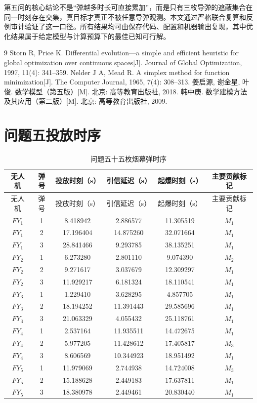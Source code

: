 \documentclass[12pt,a4paper]{article}
\begin{document}
第五问的核心结论不是“弹越多时长可直接累加”，而是只有三枚导弹的遮蔽集合在同一时刻存在交集，真目标才真正不被任意导弹观测。本文通过严格联合复算和反例审计验证了这一口径。所有结果均可由保存代码、配置和机器输出复现，其中优化结果属于给定模型与计算预算下的最佳已知可行解。

\begin{thebibliography}{9}
 Storn R, Price K. Differential evolution---a simple and efficient heuristic for global optimization over continuous spaces[J]. Journal of Global Optimization, 1997, 11(4): 341--359.
 Nelder J A, Mead R. A simplex method for function minimization[J]. The Computer Journal, 1965, 7(4): 308--313.
 姜启源, 谢金星, 叶俊. 数学模型（第五版）[M]. 北京: 高等教育出版社, 2018.
 韩中庚. 数学建模方法及其应用（第二版）[M]. 北京: 高等教育出版社, 2009.
\end{thebibliography}

\newpage
\appendix
\section{问题五投放时序}

\begin{longtable}{cccccc}
\caption{问题五十五枚烟幕弹时序}\label{tab:q5-timing}\\
\toprule
无人机 & 弹号 & 投放时刻（s） & 引信延迟（s） & 起爆时刻（s） & 主要贡献标记 \\
\midrule
\endfirsthead
\toprule
无人机 & 弹号 & 投放时刻（s） & 引信延迟（s） & 起爆时刻（s） & 主要贡献标记 \\
\midrule
\endhead
$FY_1$ & 1 & 8.418942 & 2.886577 & 11.305519 & $M_1$ \\
$FY_1$ & 2 & 17.196404 & 14.875260 & 32.071664 & $M_1$ \\
$FY_1$ & 3 & 28.841466 & 9.293785 & 38.135251 & $M_1$ \\
$FY_2$ & 1 & 6.273280 & 2.801110 & 9.074390 & $M_2$ \\
$FY_2$ & 2 & 9.271617 & 3.037679 & 12.309297 & $M_1$ \\
$FY_2$ & 3 & 11.929217 & 6.181324 & 18.110541 & $M_1$ \\
$FY_3$ & 1 & 1.229410 & 3.628295 & 4.857705 & $M_1$ \\
$FY_3$ & 2 & 18.194252 & 11.391443 & 29.585696 & $M_1$ \\
$FY_3$ & 3 & 21.063329 & 4.055432 & 25.118761 & $M_1$ \\
$FY_4$ & 1 & 2.537164 & 11.935511 & 14.472675 & $M_1$ \\
$FY_4$ & 2 & 5.977205 & 11.428612 & 17.405817 & $M_3$ \\
$FY_4$ & 3 & 8.606569 & 10.344923 & 18.951492 & $M_1$ \\
$FY_5$ & 1 & 11.979069 & 2.744938 & 14.724008 & $M_3$ \\
$FY_5$ & 2 & 15.188628 & 2.449183 & 17.637811 & $M_1$ \\
$FY_5$ & 3 & 18.380978 & 2.449461 & 20.830440 & $M_1$ \\
\bottomrule
\end{longtable}
\end{document}
